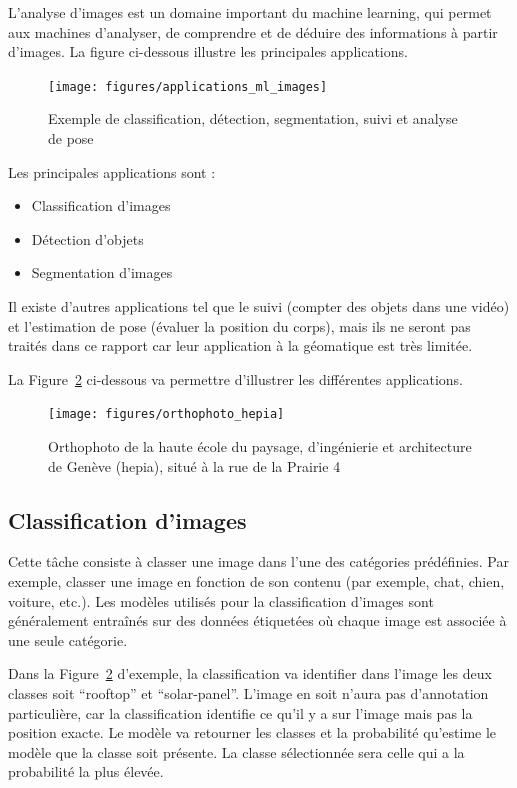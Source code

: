 L'analyse d'images est un domaine important du machine learning, qui permet aux machines d'analyser, de comprendre et de déduire des informations à partir d'images. La figure ci-dessous illustre les principales applications.

\begin{figure}[htbp]
    \centering
    \texttt{[image: figures/applications\_ml\_images]}
    \caption{Exemple de classification, détection, segmentation, suivi et analyse de pose \citep{ultralytics_2024}}
    \label{fig:applications_ml_images}
\end{figure}

Les principales applications sont :
\begin{itemize}
    \item Classification d'images
    \item Détection d'objets
    \item Segmentation d'images
\end{itemize}

Il existe d'autres applications tel que le suivi (compter des objets dans une vidéo) et l'estimation de pose (évaluer la position du corps), mais ils ne seront pas traités dans ce rapport car leur application à la géomatique est très limitée.

La Figure~\ref{fig:orthophoto_exemple_hepia} ci-dessous va permettre d'illustrer les différentes applications.

\begin{figure}[htbp]
    \centering
    \texttt{[image: figures/orthophoto\_hepia]}
    \caption{Orthophoto de la haute école du paysage, d'ingénierie et architecture de Genève (hepia), situé à la rue de la Prairie 4 \citep{sitg_orthophoto_2024}}
    \label{fig:orthophoto_exemple_hepia}
\end{figure}

\subsection{Classification d'images}

Cette tâche consiste à classer une image dans l'une des catégories prédéfinies. Par exemple, classer une image en fonction de son contenu (par exemple, chat, chien, voiture, etc.). Les modèles utilisés pour la classification d'images sont généralement entraînés sur des données étiquetées où chaque image est associée à une seule catégorie.

Dans la Figure~\ref{fig:orthophoto_exemple_hepia} d'exemple, la classification va identifier dans l'image les deux classes soit ``rooftop'' et ``solar-panel''. L'image en soit n'aura pas d'annotation particulière, car la classification identifie ce qu'il y a sur l'image mais pas la position exacte. Le modèle va retourner les classes et la probabilité qu'estime le modèle que la classe soit présente. La classe sélectionnée sera celle qui a la probabilité la plus élevée.

